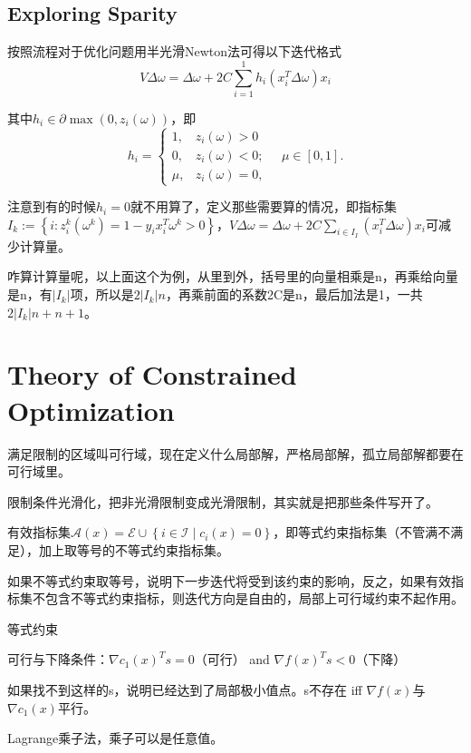 \subsection{Exploring Sparity}

按照流程对于优化问题用半光滑Newton法可得以下迭代格式
\[
  V \Delta \omega=\Delta \omega+2 C \sum_{i=1}^{1} h_{i}\left(x_{i}^{T} \Delta \omega\right) x_{i}
\]

其中$h_{i} \in \partial \max \left(0, z_{i}(\omega)\right)$，即
\[
  h_{i}=\left\{ \begin{array}{ll}
    1, & z_{i}(\omega)>0 \\
    0, & z_{i}(\omega)<0 ; \\
    \mu, & z_{i}(\omega)=0,
  \end{array} \quad \mu \in[0,1] .\right.
\]

注意到有的时候$h_i = 0$就不用算了，定义那些需要算的情况，即指标集$I_{k}:=\left\{i: z_{i}^{k}\left(\omega^{k}\right)=1-y_{i} x_{i}^{T} \omega^{k}>0\right\}$，$V \Delta \omega=\Delta \omega+2 C \sum_{i \in I_{I}}\left(x_{i}^{T} \Delta \omega\right) x_{i}$可减少计算量。

咋算计算量呢，以上面这个为例，从里到外，括号里的向量相乘是n，再乘给向量是n，有$|I_k|$项，所以是$2|I_k|n$，再乘前面的系数2C是n，最后加法是1，一共$2|I_k|n + n + 1$。

\section{Theory of Constrained Optimization}

满足限制的区域叫可行域，现在定义什么局部解，严格局部解，孤立局部解都要在可行域里。

限制条件光滑化，把非光滑限制变成光滑限制，其实就是把那些条件写开了。

有效指标集$\mathcal{A}(x)=\mathcal{E} \cup\left\{i \in \mathcal{I} \mid c_{i}(x)=0\right\}$，即等式约束指标集（不管满不满足），加上取等号的不等式约束指标集。

如果不等式约束取等号，说明下一步迭代将受到该约束的影响，反之，如果有效指标集不包含不等式约束指标，则迭代方向是自由的，局部上可行域约束不起作用。

等式约束

可行与下降条件：$\nabla c_{1}(x)^{T} s = 0$（可行） and $\nabla f(x)^{T} s<0$（下降）

如果找不到这样的s，说明已经达到了局部极小值点。s不存在  iff $\nabla f(x)$与$\nabla c_{1}(x)$平行。

Lagrange乘子法，乘子可以是任意值。


